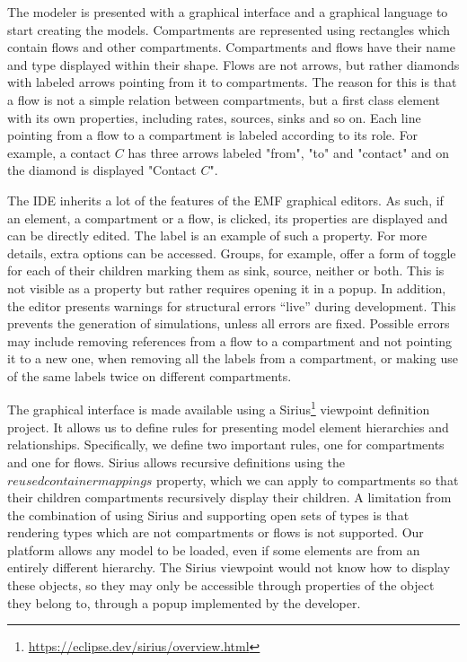 The modeler is presented with a graphical interface and a graphical language to start creating the models. Compartments are represented using rectangles which contain flows and other compartments. Compartments and flows have their name and type displayed within their shape. Flows are not arrows, but rather diamonds with labeled arrows pointing from it to compartments. The reason for this is that a flow is not a simple relation between compartments, but a first class element with its own properties, including rates, sources, sinks and so on. Each line pointing from a flow to a compartment is labeled according to its role. For example, a contact $C$ has three arrows labeled "from", "to" and "contact" and on the diamond is displayed "Contact $C$".

The IDE inherits a lot of the features of the EMF graphical editors. As such, if an element, a compartment or a flow, is clicked, its properties are displayed and can be directly edited. The label is an example of such a property. For more details, extra options can be accessed. Groups, for example, offer a form of toggle for each of their children marking them as sink, source, neither or both. This is not visible as a property but rather requires opening it in a popup. In addition, the editor presents warnings for structural errors ``live'' during development. This prevents the generation of simulations, unless all errors are fixed. Possible errors may include removing references from a flow to a compartment and not pointing it to a new one, when removing all the labels from a compartment, or making use of the same labels twice on different compartments.


The graphical interface is made available using a Sirius\footnote{\url{https://eclipse.dev/sirius/overview.html}} viewpoint definition project. It allows us to define rules for presenting model element hierarchies and relationships. Specifically, we define two important rules, one for compartments and one for flows. Sirius allows recursive definitions using the $reused container mappings$ property, which we can apply to compartments so that their children compartments recursively display their children. A limitation from the combination of using Sirius and supporting open sets of types is that rendering types which are not compartments or flows is not supported. Our platform allows any model to be loaded, even if some elements are from an entirely different hierarchy. The Sirius viewpoint would not know how to display these objects, so they may only be accessible through properties of the object they belong to, through a popup implemented by the developer.


